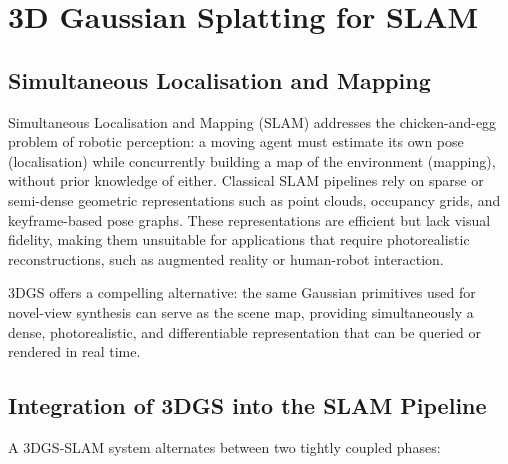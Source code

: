 \section{3D Gaussian Splatting for SLAM}
\label{sec:slam}

\subsection{Simultaneous Localisation and Mapping}

Simultaneous Localisation and Mapping (SLAM) addresses the chicken-and-egg
problem of robotic perception: a moving agent must estimate its own pose
(localisation) while concurrently building a map of the environment (mapping),
without prior knowledge of either.  Classical SLAM pipelines rely on sparse or
semi-dense geometric representations such as point clouds, occupancy grids, and
keyframe-based pose graphs.  These representations are efficient but lack visual
fidelity, making them unsuitable for applications that require photorealistic
reconstructions, such as augmented reality or human-robot interaction.

3DGS offers a compelling alternative: the same Gaussian primitives used for
novel-view synthesis can serve as the scene map, providing simultaneously a
dense, photorealistic, and differentiable representation that can be queried or
rendered in real time.

\subsection{Integration of 3DGS into the SLAM Pipeline}

A 3DGS-SLAM system alternates between two tightly coupled phases:

